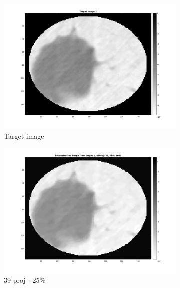 \documentclass[10pt,a4paper,titlepage]{article}
\begin{document}
\begin{figure}[H]
        	
        	\begin{subfigure}[b]{0.32\textwidth}   
        	    \centering 
            	\includegraphics[width=\textwidth]{Sample1/target1.png}
            	\caption{Target image}
        	\end{subfigure}
        	\begin{subfigure}[b]{0.32\textwidth}   
        	    \centering 
        	    \includegraphics[width=\textwidth]{Sample1/L-D_5000/39_1_4.png}
        	    \caption{39 proj - 25\%}    
        	    \label{subfig:39p1L-D}
       		\end{subfigure}
        	\begin{subfigure}[b]{0.32\textwidth}  

\end{subfigure}
\end{figure}
\end{document}
